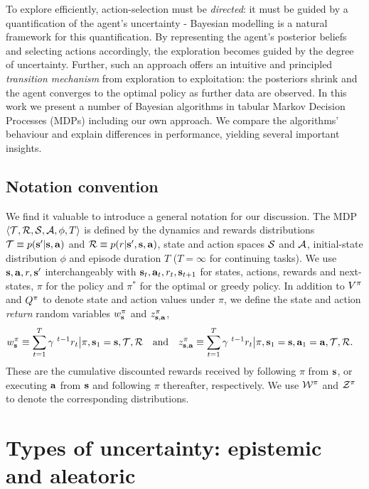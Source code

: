 \documentclass{article}
\begin{document}
To explore efficiently, action-selection must be \textit{directed}: it must be guided by a quantification of the agent's uncertainty - Bayesian modelling is a natural framework for this quantification. By representing the agent's posterior beliefs and selecting actions accordingly, the exploration becomes guided by the degree of uncertainty. Further, such an approach offers an intuitive and principled \textit{transition mechanism} from exploration to exploitation: the posteriors shrink and the agent converges to the optimal policy as further data are observed. In this work we present a number of Bayesian algorithms in tabular Markov Decision Processes (MDPs) including our own approach. We compare the algorithms' behaviour and explain differences in performance, yielding several important insights.

\subsection{Notation convention}

We find it valuable to introduce a general notation for our discussion. The MDP $\langle \mathcal{T}, \mathcal{R}, \mathcal{S}, \mathcal{A}, \phi, T \rangle$ is defined by the dynamics and rewards distributions $\mathcal{T} \equiv p(\mathbf{s}' | \mathbf{s}, \mathbf{a})$ and $\mathcal{R} \equiv p(r | \mathbf{s}', \mathbf{s}, \mathbf{a})$, state and action spaces $\mathcal{S}$ and $\mathcal{A}$, initial-state distribution $\phi$ and episode duration $T$ ($T = \infty$ for continuing tasks). We use $\mathbf{s}, \mathbf{a}, r, \mathbf{s}'$ interchangeably with $\mathbf{s}_t, \mathbf{a}_t, r_t, \mathbf{s}_{t+1}$ for states, actions, rewards and next-states, $\pi$ for the policy and $\pi^*$ for the optimal or greedy policy. In addition to $V^{\pi}$ and $Q^{\pi}$ to denote state and action values under $\pi$, we define the state and action \textit{return} random variables $w^\pi_{\mathbf{s}}$ and $z^\pi_{\mathbf{s}, \mathbf{a}}$,
\begin{align}
w^\pi_{\mathbf{s}} \equiv \sum_{t = 1}^T \gamma^{~t - 1} r_t \big| \pi, \mathbf{s}_1 = \mathbf{s}, \mathcal{T}, \mathcal{R} ~~\text{ and }~~z^\pi_{\mathbf{s}, \mathbf{a}} &\equiv \sum_{t = 1}^T \gamma^{~t - 1} r_t \big| \pi, \mathbf{s}_1 = \mathbf{s}, \mathbf{a}_1 = \mathbf{a}, \mathcal{T}, \mathcal{R}.
\end{align}
These are the cumulative discounted rewards received by following $\pi$ from $\mathbf{s}$, or executing $\mathbf{a}$ from $\mathbf{s}$ and following $\pi$ thereafter, respectively. We use $\mathcal{W}^\pi$ and $\mathcal{Z}^\pi$ to denote the corresponding distributions.

\section{Types of uncertainty: epistemic and aleatoric}
\end{document}
